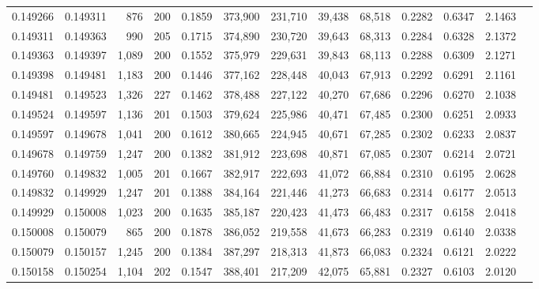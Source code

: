 \begin{tabular}{rrrrrrrrrrrrr}
0.149266 & 0.149311 &   876 & 200 &                                     0.1859 & 373,900 & 231,710 &  39,438 &  68,518 & 0.2282 & 0.6347 & 2.1463 \\
0.149311 & 0.149363 &   990 & 205 &                                     0.1715 & 374,890 & 230,720 &  39,643 &  68,313 & 0.2284 & 0.6328 & 2.1372 \\
0.149363 & 0.149397 & 1,089 & 200 &                                     0.1552 & 375,979 & 229,631 &  39,843 &  68,113 & 0.2288 & 0.6309 & 2.1271 \\
0.149398 & 0.149481 & 1,183 & 200 &                                     0.1446 & 377,162 & 228,448 &  40,043 &  67,913 & 0.2292 & 0.6291 & 2.1161 \\
0.149481 & 0.149523 & 1,326 & 227 &                                     0.1462 & 378,488 & 227,122 &  40,270 &  67,686 & 0.2296 & 0.6270 & 2.1038 \\
0.149524 & 0.149597 & 1,136 & 201 &                                     0.1503 & 379,624 & 225,986 &  40,471 &  67,485 & 0.2300 & 0.6251 & 2.0933 \\
0.149597 & 0.149678 & 1,041 & 200 &                                     0.1612 & 380,665 & 224,945 &  40,671 &  67,285 & 0.2302 & 0.6233 & 2.0837 \\
0.149678 & 0.149759 & 1,247 & 200 &                                     0.1382 & 381,912 & 223,698 &  40,871 &  67,085 & 0.2307 & 0.6214 & 2.0721 \\
0.149760 & 0.149832 & 1,005 & 201 &                                     0.1667 & 382,917 & 222,693 &  41,072 &  66,884 & 0.2310 & 0.6195 & 2.0628 \\
0.149832 & 0.149929 & 1,247 & 201 &                                     0.1388 & 384,164 & 221,446 &  41,273 &  66,683 & 0.2314 & 0.6177 & 2.0513 \\
0.149929 & 0.150008 & 1,023 & 200 &                                     0.1635 & 385,187 & 220,423 &  41,473 &  66,483 & 0.2317 & 0.6158 & 2.0418 \\
0.150008 & 0.150079 &   865 & 200 &                                     0.1878 & 386,052 & 219,558 &  41,673 &  66,283 & 0.2319 & 0.6140 & 2.0338 \\
0.150079 & 0.150157 & 1,245 & 200 &                                     0.1384 & 387,297 & 218,313 &  41,873 &  66,083 & 0.2324 & 0.6121 & 2.0222 \\
0.150158 & 0.150254 & 1,104 & 202 &                                     0.1547 & 388,401 & 217,209 &  42,075 &  65,881 & 0.2327 & 0.6103 & 2.0120 \\

\end{tabular}
